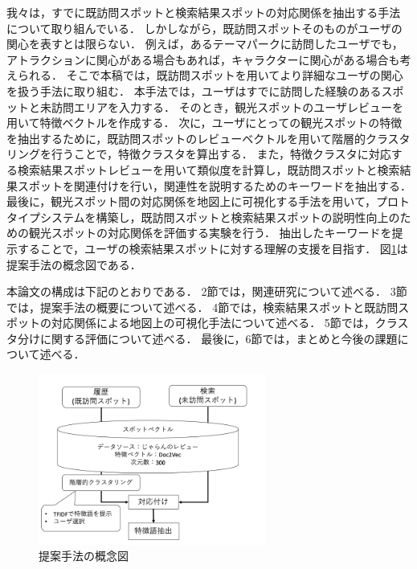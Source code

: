 \documentclass{deimj}
\begin{document}
我々は，すでに既訪問スポットと検索結果スポットの対応関係を抽出する手法について取り組んでいる\cite{潘DEIM}．
しかしながら，既訪問スポットそのものがユーザの関心を表すとは限らない．
例えば，あるテーマパークに訪問したユーザでも，アトラクションに関心がある場合もあれば，キャラクターに関心がある場合も考えられる．
そこで本稿では，既訪問スポットを用いてより詳細なユーザの関心を扱う手法に取り組む．
本手法では，ユーザはすでに訪問した経験のあるスポットと未訪問エリアを入力する．
そのとき，観光スポットのユーザレビューを用いて特徴ベクトルを作成する．
次に，ユーザにとっての観光スポットの特徴を抽出するために，既訪問スポットのレビューベクトルを用いて階層的クラスタリングを行うことで，特徴クラスタを算出する．
また，特徴クラスタに対応する検索結果スポットレビューを用いて類似度を計算し，既訪問スポットと検索結果スポットを関連付けを行い，関連性を説明するためのキーワードを抽出する．
最後に，観光スポット間の対応関係を地図上に可視化する手法\cite{潘STI}を用いて，プロトタイプシステムを構築し，既訪問スポットと検索結果スポットの説明性向上のための観光スポットの対応関係を評価する実験を行う．
抽出したキーワードを提示することで，ユーザの検索結果スポットに対する理解の支援を目指す．
図\ref{fig:image}は提案手法の概念図である．

本論文の構成は下記のとおりである．
2節では，関連研究について述べる．
3節では，提案手法の概要について述べる．
4節では，検索結果スポットと既訪問スポットの対応関係による地図上の可視化手法について述べる．
5節では，クラスタ分けに関する評価について述べる．
最後に，6節では，まとめと今後の課題について述べる．

\begin{figure}[t]
  \begin{center}
    \includegraphics[clip,width=7.5cm]{picture/system_image.png}
    \caption{提案手法の概念図}
    \label{fig:image}
   \end{center}
\end{figure}


\end{document}
